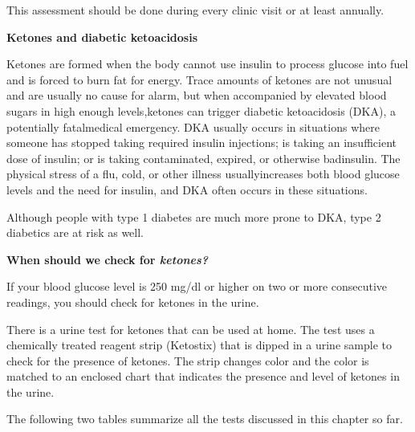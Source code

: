 This assessment should be done during every clinic visit or at least annually.

\noindent\textbf{Ketones and diabetic ketoacidosis}

Ketones are formed when the body cannot use insulin to process glucose into fuel and is forced to burn fat for energy. Trace amounts of ketones are not unusual and are usually no cause for alarm, but when accompanied by elevated blood sugars in high enough levels,\break ketones can trigger diabetic ketoacidosis (DKA), a potentially fatal\break medical emergency. DKA usually occurs in situations where someone has stopped taking required insulin injections; is taking an insufficient dose of insulin; or is taking contaminated, expired, or otherwise bad\break insulin. The physical stress of a flu, cold, or other illness usually\break increases both blood glucose levels and the need for insulin, and DKA often occurs in these situations.

Although people with type 1 diabetes are much more prone to DKA, type 2 diabetics are at risk as well.

\noindent\textbf{When should we check for \textit{ketones?}}

If your blood glucose level is 250 mg/dl or higher on two or more consecutive readings, you should check for ketones in the urine.

There is a urine test for ketones that can be used at home. The test uses a chemically treated reagent strip (Ketostix) that is dipped in a urine sample to check for the presence of ketones. The strip changes color and the color is matched to an enclosed chart that indicates the presence and level of ketones in the urine.


\vskip 10pt

The following two tables summarize all the tests discussed in this chapter so far.

\vskip 8pt

